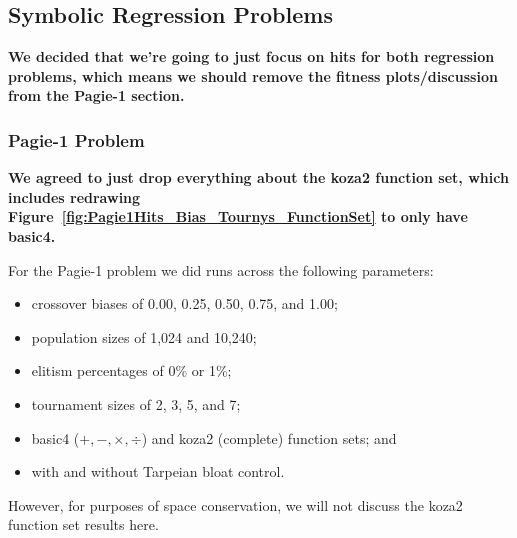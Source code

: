 \documentclass{sig-alternate}
\begin{document}
%
%
%
%


\subsection{Symbolic Regression Problems}

\textbf{We decided that we're going to just focus on hits for both regression problems, which means we should remove the fitness plots/discussion from the Pagie-1 section.}

\subsubsection{Pagie-1 Problem}

\textbf{We agreed to just drop everything about the koza2 function set, which includes redrawing Figure~\ref{fig:Pagie1Hits_Bias_Tournys_FunctionSet} to only have basic4.}

For the Pagie-1 problem we did runs across the following parameters:

\begin{itemize}
	\item crossover biases of 0.00, 0.25, 0.50, 0.75, and 1.00;
	\item population sizes of 1,024 and 10,240;
	\item elitism percentages of 0\% or 1\%;
	\item tournament sizes of 2, 3, 5, and 7;
	\item basic4 ($+, -, \times, \div$) and koza2 (complete) function sets; and
	\item with and without Tarpeian bloat control.
\end{itemize}

However, for purposes of space conservation, we will not discuss the koza2 function set results here.
\end{document}
